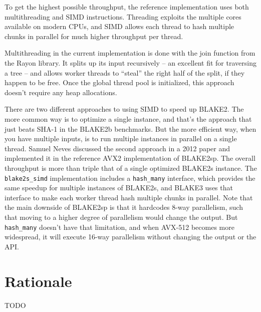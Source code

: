 \documentclass[11pt,notitlepage,a4paper]{article}
\newcommand{\name}{BLAKE3\xspace}
\begin{document}
To get the highest possible throughput, the reference implementation uses both multithreading and SIMD instructions. Threading exploits the multiple cores available on modern CPUs, and SIMD allows each thread to hash multiple chunks in parallel for much higher throughput per thread.

Multithreading in the current implementation is done with the join function from the Rayon library. It splits up its input recursively -- an excellent fit for traversing a tree -- and allows worker threads to ``steal'' the right half of the split, if they happen to be free. Once the global thread pool is initialized, this approach doesn't require any heap allocations.

There are two different approaches to using SIMD to speed up BLAKE2. The more common way is to optimize a single instance, and that's the approach that just beats SHA-1 in the BLAKE2b benchmarks. But the more efficient way, when you have multiple inputs, is to run multiple instances in parallel on a single thread. Samuel Neves discussed the second approach in a 2012 paper and implemented it in the reference AVX2 implementation of BLAKE2sp. The overall throughput is more than triple that of a single optimized BLAKE2s instance. The \texttt{blake2s\_simd} implementation includes a \texttt{hash\_many} interface, which provides the same speedup for multiple instances of BLAKE2s, and \name uses that interface to make each worker thread hash multiple chunks in parallel. Note that the main downside of BLAKE2sp is that it hardcodes 8-way parallelism, such that moving to a higher degree of parallelism would change the output. But \texttt{hash\_many} doesn't have that limitation, and when AVX-512 becomes more widespread, it will execute 16-way parallelism without changing the output or the API.

\section{Rationale}\label{sec:rationale}

TODO



\end{document}
